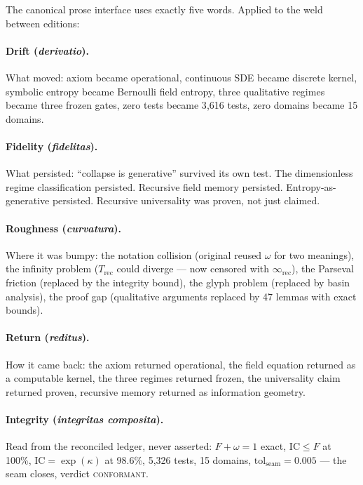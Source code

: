 \documentclass[
  aps,
  prd,
  preprint,
  superscriptaddress,
  nofootinbib,
  floatfix,
  longbibliography
]{revtex4-2}
\newcommand{\tolseam}{\mathrm{tol}_{\mathrm{seam}}}
\newcommand{\regime}[1]{\textrm{\upshape\scshape#1}}
\newcommand{\conform}{\regime{conformant}}
\newcommand{\IC}{\mathrm{IC}}
\newcommand{\Fid}{F}
\newcommand{\Drft}{\omega}
\newcommand{\Logint}{\kappa}
\newcommand{\lat}[1]{\textit{#1}}
\begin{document}
The canonical prose interface uses exactly five words.
Applied to the weld between editions:

\paragraph{Drift (\lat{derivatio}).}
What moved: axiom became operational, continuous SDE became
discrete kernel, symbolic entropy became Bernoulli field
entropy, three qualitative regimes became three frozen
gates, zero tests became 3{,}616 tests, zero domains
became 15 domains.

\paragraph{Fidelity (\lat{fidelitas}).}
What persisted: ``collapse is generative'' survived
its own test. The dimensionless regime classification
persisted. Recursive field memory persisted.
Entropy-as-generative persisted. Recursive universality
was proven, not just claimed.

\paragraph{Roughness (\lat{curvatura}).}
Where it was bumpy: the notation collision
(original reused $\Drft$ for two meanings),
the infinity problem ($T_{\mathrm{rec}}$ could diverge —
now censored with $\infty_{\mathrm{rec}}$),
the Parseval friction (replaced by the integrity bound),
the glyph problem (replaced by basin analysis),
the proof gap (qualitative arguments replaced by
47 lemmas with exact bounds).

\paragraph{Return (\lat{reditus}).}
How it came back: the axiom returned operational,
the field equation returned as a computable kernel,
the three regimes returned frozen, the universality
claim returned proven, recursive memory returned as
information geometry.

\paragraph{Integrity (\lat{integritas composita}).}
Read from the reconciled ledger, never asserted:
$\Fid + \Drft = 1$ exact, $\IC \leq \Fid$ at 100\%,
$\IC = \exp(\Logint)$ at 98.6\%,
5{,}326 tests, 15 domains,
$\tolseam = 0.005$ — the seam closes,
verdict \conform{}.
\end{document}
